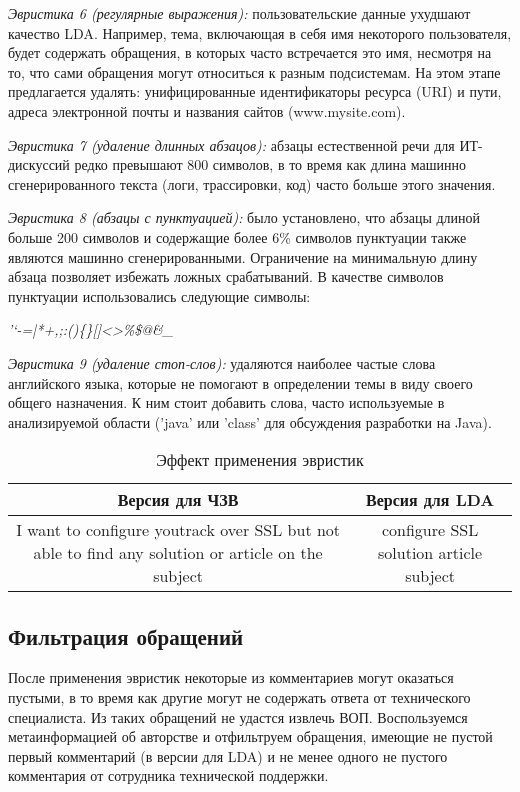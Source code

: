 \textit{Эвристика 6 (регулярные выражения):} пользовательские данные ухудшают качество LDA. Например, тема, включающая в себя имя некоторого пользователя, будет содержать обращения, в которых часто встречается это имя, несмотря на то, что сами обращения могут относиться к разным подсистемам. На этом этапе предлагается удалять: унифицированные идентификаторы ресурса (URI) и пути, адреса электронной почты и названия сайтов (www.mysite.com).

\textit{Эвристика 7 (удаление длинных абзацов):} абзацы естественной речи для ИТ-дискуссий редко превышают 800 символов, в то время как длина машинно сгенерированного текста (логи, трассировки, код) часто больше этого значения.

\textit{Эвристика 8 (абзацы с пунктуацией):} было установлено, что абзацы длиной больше 200 символов и содержащие более 6\% символов пунктуации также являются машинно сгенерированными. Ограничение на минимальную длину абзаца позволяет избежать ложных срабатываний. В качестве символов пунктуации использовались следующие символы:

\vspace{2mm}

\noindent \textit{'`-=|\/*+,;:()\{\}[]<>\%\$@\&\_}

\vspace{2mm}

\textit{Эвристика 9 (удаление стоп-слов):} удаляются наиболее частые слова английского языка, которые не помогают в определении темы в виду своего общего назначения. К ним стоит добавить слова, часто используемые в анализируемой области ('java' или 'class' для обсуждения разработки на Java).
\begin{table}[!ht]
\caption{Эффект применения эвристик}
\label{heuristics_table}
\centering
\begin{tabular}{|c|c|}
\hline
Версия для ЧЗВ & Версия для LDA \\
\hline
\parbox[t]{4cm}{I want to configure youtrack over SSL but
not able to find any solution or article on the subject} & \parbox[t]{4cm}{configure SSL solution article subject}\\
\hline
\end{tabular}
\end{table}
\subsection{Фильтрация обращений}
\label{subsec:ticketfilter}

После применения эвристик некоторые из комментариев могут оказаться пустыми, в то время как другие могут не содержать ответа от технического специалиста. Из таких обращений не удастся извлечь ВОП. Воспользуемся метаинформацией об авторстве и отфильтруем обращения, имеющие не пустой первый комментарий (в версии для LDA) и не менее одного не пустого комментария от сотрудника технической поддержки.

